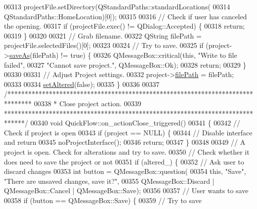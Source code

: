 \begin{DoxyCode}
00313   projectFile.setDirectory(QStandardPaths::standardLocations(
00314                              QStandardPaths::HomeLocation)[0]);
00315 
00316   \textcolor{comment}{// Check if user has canceled the opening.}
00317   \textcolor{keywordflow}{if} (projectFile.exec() != QDialog::Accepted) \{
00318     \textcolor{keywordflow}{return};
00319   \}
00320 
00321   \textcolor{comment}{// Grab filename.}
00322   QString filePath = projectFile.selectedFiles()[0];
00323 
00324   \textcolor{comment}{// Try to save.}
00325   \textcolor{keywordflow}{if} (project->\hyperlink{class_project_ad32a31d548ad38f4cbbe0f95879a68e5}{saveAs}(filePath) != \textcolor{keyword}{true}) \{
00326     QMessageBox::critical(\textcolor{keyword}{this}, \textcolor{stringliteral}{"Write to file failed"},
00327                           \textcolor{stringliteral}{"Cannot save project."}, QMessageBox::Ok);
00328     \textcolor{keywordflow}{return};
00329   \}
00330 
00331   \textcolor{comment}{// Adjust Project settings.}
00332   project->\hyperlink{class_project_a79f30adcefd0b72bd4ac7db724bc9531}{filePath} = filePath;
00333 
00334   \hyperlink{group___window_ga4b63ea5ca52a9eea14db0a22b5a133f8}{setAltered}(\textcolor{keyword}{false});
00335 \}
00336 
00337 \textcolor{comment}{/*******************************************************************************}
00338 \textcolor{comment}{* Close project action.}
00339 \textcolor{comment}{******************************************************************************/}
00340 \textcolor{keywordtype}{void} QuickFlow::on\_actionClose\_triggered()
00341 \{
00342   \textcolor{comment}{// Check if project is open}
00343   \textcolor{keywordflow}{if} (project == NULL) \{
00344     \textcolor{comment}{// Disable interface and return}
00345     noProjectInterface();
00346     \textcolor{keywordflow}{return};
00347   \}
00348 
00349   \textcolor{comment}{// A project is open. Check for alterations and try to save.}
00350   \textcolor{comment}{// Check whether it does need to save the project or not}
00351   \textcolor{keywordflow}{if} (altered\_) \{
00352     \textcolor{comment}{// Ask user to discard changes}
00353     \textcolor{keywordtype}{int} button = QMessageBox::question(
00354                    \textcolor{keyword}{this}, \textcolor{stringliteral}{"Save"}, \textcolor{stringliteral}{"There are unsaved changes, save it?"},
00355                    QMessageBox::Discard | QMessageBox::Cancel | QMessageBox::Save);
00356 
00357     \textcolor{comment}{// User wants to save}
00358     \textcolor{keywordflow}{if} (button == QMessageBox::Save) \{
00359       \textcolor{comment}{// Try to save}

\end{DoxyCode}
